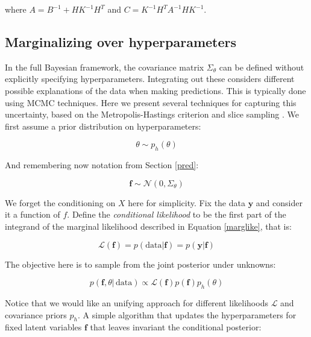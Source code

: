 \documentclass[10pt,a4paper,twoside]{book}
\begin{document}
where $A = B^{-1} + HK^{-1}H^T$ and $C = K^{-1}H^T A^{-1}HK^{-1}$.

\subsection{Marginalizing over hyperparameters}
\label{marginalize}

In the full Bayesian framework, the covariance matrix $\Sigma_{\theta}$ can be defined without explicitly specifying hyperparameters. Integrating out these considers different possible explanations of the data when making predictions. This is typically done using MCMC techniques. Here we present several techniques for capturing this uncertainty, based on the Metropolis-Hastings criterion and slice sampling \cite{Murray2010}. We first assume a prior distribution on hyperparameters:

\begin{equation}
\theta \sim p_{h}(\theta)
\end{equation}

And remembering now notation from Section \ref{pred}:

\begin{equation}
\boldsymbol{f} \sim \mathcal{N}(0, \Sigma_\theta)
\end{equation}

We forget the conditioning on $X$ here for simplicity. Fix the data $\boldsymbol{y}$ and consider it a function of $f$. Define the \textit{conditional likelihood} to be the first part of the integrand of the marginal likelihood described in Equation \ref{marglike}, that is:

\begin{equation}
\mathcal{L(\boldsymbol{f})} = p(\mathrm{data}|\boldsymbol{f}) = p(\boldsymbol{y}|\boldsymbol{f})
\end{equation}

The objective here is to sample from the joint posterior under unknowns:

\begin{equation}
p(\boldsymbol{f}, \theta|\, \mathrm{data}) \propto \mathcal{L}(\boldsymbol{f})p(\boldsymbol{f}) p_h(\theta)
\end{equation}

Notice that we would like an unifying approach for different likelihoods $\mathcal{L}$ and covariance priors $p_h$. A simple algorithm that updates the hyperparameters for fixed latent variables $\boldsymbol{f}$ that leaves invariant the conditional posterior:
\end{document}
